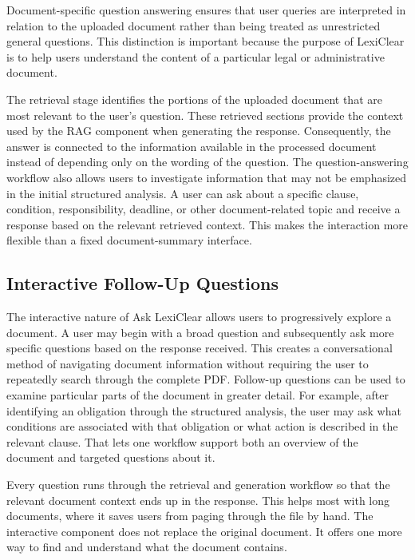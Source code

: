 \documentclass[12pt,a4paper,oneside]{report}
\begin{document}
Document-specific question answering ensures that user queries are interpreted in relation to the uploaded document rather than being treated as unrestricted general questions. This distinction is important because the purpose of LexiClear is to help users understand the content of a particular legal or administrative document.

The retrieval stage identifies the portions of the uploaded document that are most relevant to the user's question. These retrieved sections provide the context used by the RAG component when generating the response. Consequently, the answer is connected to the information available in the processed document instead of depending only on the wording of the question. The question-answering workflow also allows users to investigate information that may not be emphasized in the initial structured analysis. A user can ask about a specific clause, condition, responsibility, deadline, or other document-related topic and receive a response based on the relevant retrieved context. This makes the interaction more flexible than a fixed document-summary interface.

\subsection{Interactive Follow-Up Questions}

The interactive nature of Ask LexiClear allows users to progressively explore a document. A user may begin with a broad question and subsequently ask more specific questions based on the response received. This creates a conversational method of navigating document information without requiring the user to repeatedly search through the complete PDF. Follow-up questions can be used to examine particular parts of the document in greater detail. For example, after identifying an obligation through the structured analysis, the user may ask what conditions are associated with that obligation or what action is described in the relevant clause. That lets one workflow support both an overview of the document and targeted questions about it.

Every question runs through the retrieval and generation workflow so that the relevant document context ends up in the response. This helps most with long documents, where it saves users from paging through the file by hand. The interactive component does not replace the original document. It offers one more way to find and understand what the document contains.
\end{document}
